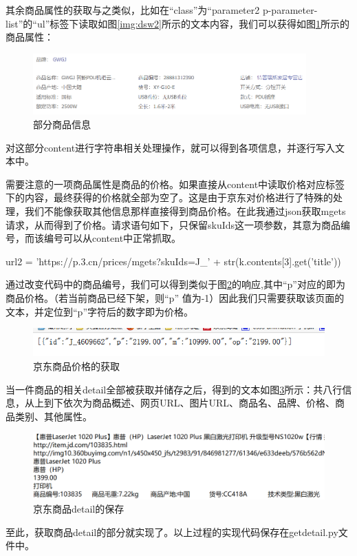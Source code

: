 其余商品属性的获取与之类似，比如在“class”为“parameter2 p-parameter-list”的“ul”标签下读取如图\ref{img:dsw2}所示的文本内容，我们可以获得如图\ref{img:dsw3}所示的商品属性：

\begin{figure}[htbp]
\centering
\includegraphics[width=10.5cm]{img/dsw/dsw3.png}
\caption{部分商品信息}
\label{img:dsw3}
\end{figure}

对这部分content进行字符串相关处理操作，就可以得到各项信息，并逐行写入文本中。

需要注意的一项商品属性是商品的价格。如果直接从content中读取价格对应标签下的内容，最终获得的价格就全部为空了。这是由于京东对价格进行了特殊的处理，我们不能像获取其他信息那样直接得到商品价格。在此我通过json获取mgets请求，从而得到了价格。请求语句如下，只保留skuIds这一项参数，其意为商品编号，而该编号可以从content中正常抓取。

\begin{python}
url2 = 'https://p.3.cn/prices/mgets?skuIds=J_' + str(k.contents[3].get('title'))
\end{python}

通过改变代码中的商品编号，我们可以得到类似于图\ref{img:dsw4}的响应,其中“p”对应的即为商品价格。（若当前商品已经下架，则“p” 值为-1）因此我们只需要获取该页面的文本，并定位到“p”字符后的数字即为价格。

\begin{figure}[htbp]
\centering
\includegraphics[width=11.5cm]{img/dsw/dsw4.png}
\caption{京东商品价格的获取}
\label{img:dsw4}
\end{figure}

当一件商品的相关detail全部被获取并储存之后，得到的文本如图\ref{img:dsw5}所示：共八行信息，从上到下依次为商品概述、网页URL、图片URL、商品名、品牌、价格、商品类别、其他属性。

\begin{figure}[htbp]
\centering
\includegraphics[width=12.5cm]{img/dsw/dsw5.png}
\caption{京东商品detail的保存}
\label{img:dsw5}
\end{figure}

至此，获取商品detail的部分就实现了。以上过程的实现代码保存在getdetail.py文件中。